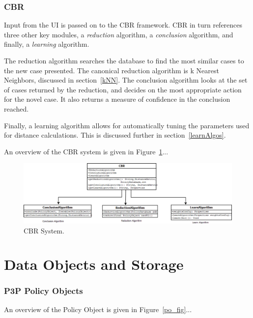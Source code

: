 \subsubsection{CBR} %
Input from the UI is passed on to the CBR framework. CBR in turn references three other key modules, a \emph{reduction} algorithm, a \emph{conclusion} algorithm, and finally, a \emph{learning} algorithm.

The reduction algorithm searches the database to find the most similar cases to the new case presented. The canonical reduction algorithm is k Nearest Neighbors, discussed in section~\ref{kNN}. The conclusion algorithm looks at the set of cases returned by the reduction, and decides on the most appropriate action for the novel case. It also returns a measure of confidence in the conclusion reached.

Finally, a learning algorithm allows for automatically tuning the parameters used for distance calculations. This is discussed further in section~\ref{learnAlgos}.

An overview of the CBR system is given in Figure~\ref{cbr_fig}...


\begin{figure}[htbp]
\begin{center}
\includegraphics[width = \textwidth]{DesignReport/uml/CBR.png}
\caption{CBR System.}
\label{cbr_fig}
\end{center}
\end{figure}


\section{Data Objects and Storage}

\subsubsection{P3P Policy Objects}\label{p3pPolObj}
An overview of the Policy Object is given in Figure~\ref{po_fig}...

